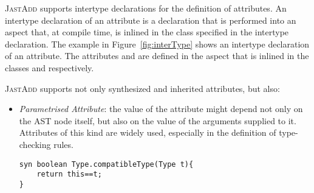 \textsc{JastAdd} supports intertype declarations for the definition of attributes. An intertype declaration
of an attribute is a declaration that is performed into an aspect that, at compile time,
is inlined in the class specified in the intertype declaration. The example in Figure~\ref{fig:interType}
shows an intertype declaration of an attribute.
The attributes  and  are defined in the aspect 
that is inlined in the classes  and  respectively.

\textsc{JastAdd} supports not only synthesized and inherited attributes, but also:
\begin{itemize}
    \item \emph{Parametrised Attribute}: the value of the attribute might depend
    not only on the AST node itself, but also on the value of the arguments supplied
    to it. Attributes of this kind are widely used, especially in the definition of
    type-checking rules.
    \begin{lstlisting}[language=JastAdd]
syn boolean Type.compatibleType(Type t){
    return this==t;
}
    \end{lstlisting}



\end{itemize}
